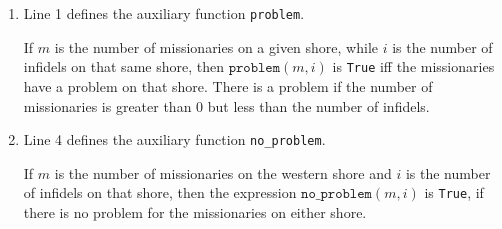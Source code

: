 \begin{enumerate}
\item Line 1 defines the auxiliary function \texttt{problem}.

      If $m$ is the number of missionaries on a given shore, while $i$ is the number of infidels on
      that same shore, then $\texttt{problem}(m, i)$ is \texttt{True} iff the missionaries have a problem on that
      shore.  There is a problem if the number of missionaries is greater than $0$ but less than the number of
      infidels. 
\item Line 4 defines the auxiliary function \texttt{no\_problem}.

      If $m$ is the number of missionaries on the western shore and $i$ is the number of infidels on
      that shore, then the expression $\texttt{no\_problem}(m, i)$ is \texttt{True}, if there is no problem
      for the missionaries on either shore.


\end{enumerate}

